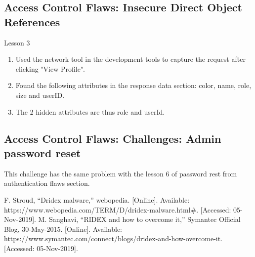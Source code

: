 \documentclass[conference]{IEEEtran}
\begin{document}
\subsection{Access Control Flaws: Insecure Direct Object References}
Lesson 3

\begin{enumerate}
\item Used the network tool in the development tools to capture the request after clicking "View Profile".
\item Found the following attributes in the response data section: color, name, role, size and userID.
\item The 2 hidden attributes are thus role and userId.
\end{enumerate}

\subsection{Access Control Flaws: Challenges: Admin password reset}
This challenge has the same problem with the lesson 6 of password rest from authentication flaws section.



\begin{thebibliography}{00}
 F. Stroud, “Dridex malware,” webopedia. [Online]. Available: https://www.webopedia.com/TERM/D/dridex-malware.html\#. [Accessed: 05-Nov-2019].
 M. Sanghavi, “RIDEX and how to overcome it,” Symantec Official Blog, 30-May-2015. [Online]. Available: https://www.symantec.com/connect/blogs/dridex-and-how-overcome-it. [Accessed: 05-Nov-2019].

\end{thebibliography}
\end{document}
